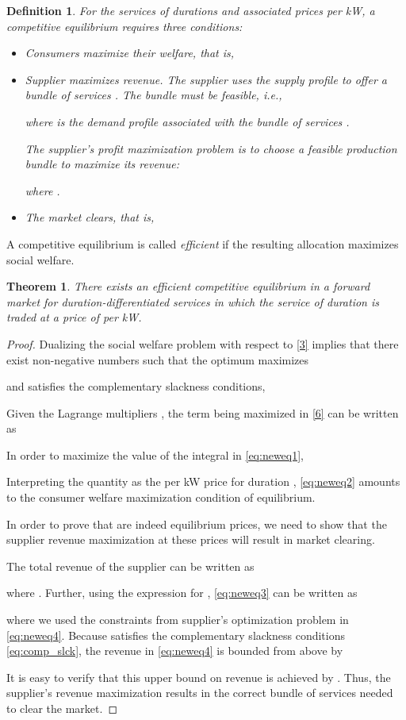 \documentclass[10pt,draftcls,onecolumn]{IEEEtran}
\newtheorem{theorem}{Theorem}
\newtheorem{definition}{Definition}
\newcounter{l1}
\newcounter{l2}
\newcounter{l3}
\begin{document}
\begin{definition}
For the services  of durations  and associated prices  per kW,  a competitive equilibrium requires three conditions:

\begin{itemize}
\item Consumers maximize their welfare, that is,


\item Supplier maximizes  revenue.  
The supplier uses the supply profile  to offer a bundle of services .  The bundle must be feasible, i.e., 

where  is the demand profile associated with the bundle of services .

 The supplier's profit maximization problem is to choose a feasible production bundle to maximize its revenue:

where .
\item The market clears, that is,

    \end{itemize}
\end{definition}
A competitive equilibrium is called \textit{efficient} if the resulting allocation maximizes social welfare.
\begin{theorem}
There exists an efficient competitive equilibrium in a forward market for duration-differentiated services in which the service of duration  is traded at a  price of  per kW. 
\label{thm:market}
\end{theorem}
\begin{proof}
Dualizing the social welfare problem with respect to \eqref{3} implies that there 
exist non-negative numbers  such that the optimum  maximizes

and satisfies the complementary slackness conditions,


Given the Lagrange multipliers , the term being maximized in \eqref{6} can be written as

In order to maximize the value of the integral in \eqref{eq:neweq1}, 

Interpreting the quantity  as the per kW price  for duration ,  \eqref{eq:neweq2} amounts to the consumer welfare maximization condition of equilibrium. 

In order to prove that  are indeed equilibrium prices, we need to show that the supplier revenue maximization at these prices will result in market clearing. 

The total revenue of the supplier can be written as 

where . Further,  using the expression for , \eqref{eq:neweq3} can be written as

where we used the constraints from supplier's optimization problem in \eqref{eq:neweq4}. Because  satisfies the complementary slackness conditions  \eqref{eq:comp_slck}, the revenue in \eqref{eq:neweq4} is bounded from above by

It is easy to verify that this upper bound on revenue is achieved by  . Thus, the supplier's revenue maximization results in the correct bundle of  services needed to clear the market. 
\end{proof}
\end{document}
